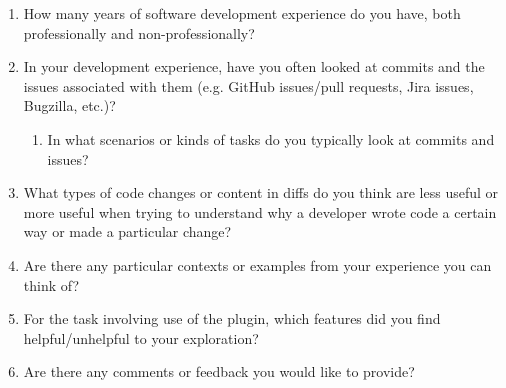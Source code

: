 \begin{enumerate}
    \item How many years of software development experience do you have, both professionally and non-professionally?
    \item In your development experience, have you often looked at commits and the issues associated with them (e.g. GitHub issues/pull requests, Jira issues, Bugzilla, etc.)?
        \begin{enumerate}
            \item In what scenarios or kinds of tasks do you typically look at commits and issues?
        \end{enumerate}
    \item What types of code changes or content in diffs do you think are less useful or more useful when trying to understand why a developer wrote code a certain way or made a particular change? 
    \item Are there any particular contexts or examples from your experience you can think of?
    \item For the task involving use of the plugin, which features did you find helpful/unhelpful to your exploration?
    \item Are there any comments or feedback you would like to provide?
\end{enumerate}

\endinput

This would be any supporting material not central to the dissertation.
For example:
\begin{itemize}
\item additional details of methodology and/or data;
\item diagrams of specialized equipment developed.;
\item copies of questionnaires and survey instruments.
\end{itemize}